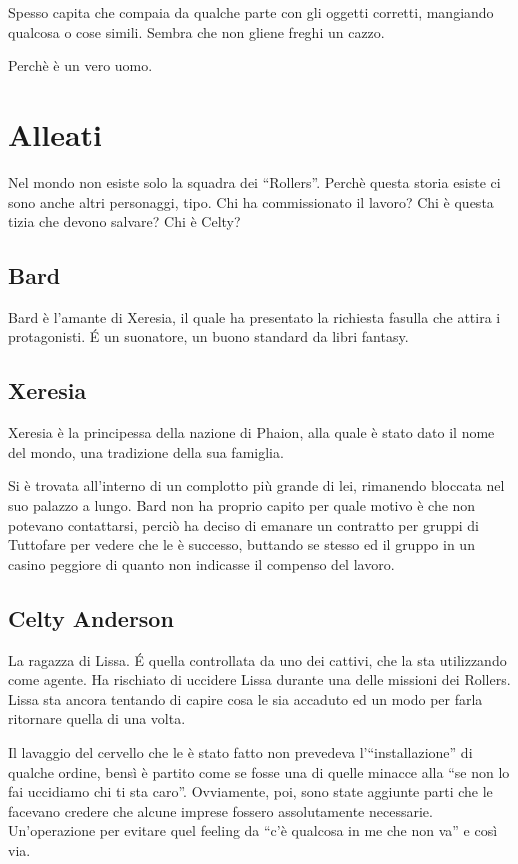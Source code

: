 \documentclass[9pt,a4paper,cleardoubleempty]{scrbook}
\begin{document}
        Spesso capita che compaia da qualche parte con gli oggetti
        corretti, mangiando qualcosa o cose simili. Sembra che non gliene
        freghi un cazzo.

        Perchè è un vero uomo.

    \chapter{Alleati}
        
        Nel mondo non esiste solo la squadra dei ``Rollers''. Perchè questa
        storia esiste ci sono anche altri personaggi, tipo. Chi ha
        commissionato il lavoro? Chi è questa tizia che devono salvare? Chi
        è Celty?

    \section{Bard}
        Bard è l'amante di Xeresia, il quale ha presentato la richiesta
        fasulla che attira i protagonisti. \'E un suonatore, un buono
        standard da libri fantasy.

    \section{Xeresia}
        Xeresia è la principessa della nazione di Phaion, alla quale è
        stato dato il nome del mondo, una tradizione della sua famiglia. 

        Si è trovata all'interno di un complotto più grande di lei,
        rimanendo bloccata nel suo palazzo a lungo. Bard non ha proprio
        capito per quale motivo è che non potevano contattarsi, perciò ha
        deciso di emanare un contratto per gruppi di Tuttofare per vedere
        che le è successo, buttando se stesso ed il gruppo in un casino
        peggiore di quanto non indicasse il compenso del lavoro.
    
    \section{Celty Anderson}
      La ragazza di Lissa. \'E quella controllata da uno dei cattivi, che
      la sta utilizzando come agente. Ha rischiato di uccidere Lissa
      durante una delle missioni dei Rollers. Lissa sta ancora tentando di
      capire cosa le sia accaduto ed un modo per farla ritornare quella di
      una volta.

      Il lavaggio del cervello che le è stato fatto non prevedeva
      l'``installazione'' di qualche ordine, bensì è partito come se fosse
      una di quelle minacce alla ``se non lo fai uccidiamo chi ti sta
      caro''. Ovviamente, poi, sono state aggiunte parti che le facevano
      credere che alcune imprese fossero assolutamente necessarie.
      Un'operazione per evitare quel feeling da ``c'è qualcosa in me che
      non va'' e così via.
\end{document}
